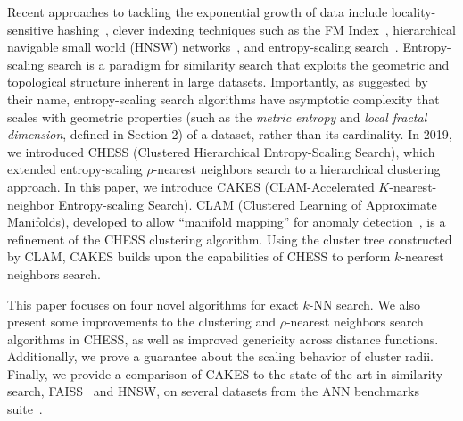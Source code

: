 Recent approaches to tackling the exponential growth of data include locality-sensitive hashing~\cite{indyk1999sublinear}, clever indexing techniques such as the FM Index~\cite{simpson2010efficient}, hierarchical navigable small world (HNSW) networks~\cite{Malkov2016EfficientAR}, and entropy-scaling search~\cite{yu2015entropy, ishaq2019clustered}.
Entropy-scaling search is a paradigm for similarity search that exploits the geometric and topological structure inherent in large datasets.
Importantly, as suggested by their name, entropy-scaling search algorithms have asymptotic complexity that scales with geometric properties (such as the \emph{metric entropy} and \emph{local fractal dimension}, defined in Section 2) of a dataset, rather than its cardinality.
In 2019, we introduced CHESS (Clustered Hierarchical Entropy-Scaling Search), which extended entropy-scaling $\rho$-nearest neighbors search to a hierarchical clustering approach.
In this paper, we introduce CAKES (CLAM-Accelerated $K$-nearest-neighbor Entropy-scaling Search).
CLAM (Clustered Learning of Approximate Manifolds), developed to allow ``manifold mapping'' for anomaly detection~\cite{ishaq2021clustered}, is a refinement of the CHESS clustering algorithm. 
Using the cluster tree constructed by CLAM, CAKES builds upon the capabilities of CHESS to perform $k$-nearest neighbors search.

This paper focuses on four novel algorithms for exact $k$-NN search.
We also present some improvements to the clustering and $\rho$-nearest neighbors search algorithms in CHESS, as well as improved genericity across distance functions.
Additionally, we prove a guarantee about the scaling behavior of cluster radii. 
Finally, we provide a comparison of CAKES to the state-of-the-art in similarity search, FAISS~\cite{johnson2019billion} and HNSW, on several datasets from the ANN benchmarks suite~\cite{aumuller2020ann}.
